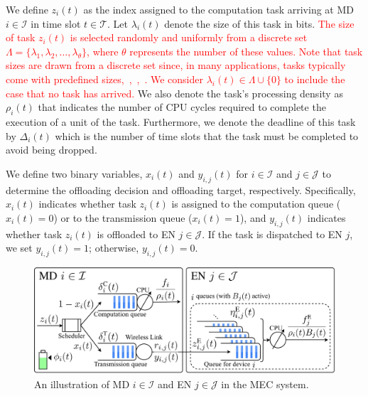 \documentclass[10pt, journal,letterpaper]{IEEEtran}
\begin{document}
We define $z_i(t)$ as the index assigned to the computation task arriving at MD $i \in \mathcal{I}$ in time slot $t \in \mathcal{T}$. Let $\lambda_i(t)$ denote the size of this task in bits. \textcolor{red}{The size of task \( z_i(t) \) is selected randomly and uniformly from a discrete set \( \Lambda = \{\lambda_1, \lambda_2, \ldots, \lambda_{\theta}\} \), where \( \theta \) represents the number of these values. Note that task sizes are drawn from a discrete set since, in many applications, tasks typically come with predefined sizes,~\cite{wang2020intelligent},~\cite{zhang2019toward},~\cite{allahham2022multi}. We consider $\lambda_i(t) \in \Lambda \cup \{0\}$ to include the case that no task has arrived.} We also denote the task's processing density as $\rho_i(t)$ that indicates the number of CPU cycles required to complete the execution of a unit of the task. Furthermore, we denote the deadline of this task by $\Delta_i(t)$ which is the number of time slots that the task must be completed to avoid being dropped.

We define two binary variables, $x_i(t)$ and $y_{i,j}(t)$ for $i \in \mathcal{I}$ and $j \in \mathcal{J}$ to determine the offloading decision and offloading target, respectively. Specifically, $x_i(t)$ indicates whether task $z_i(t)$ is assigned to the computation queue ($x_i(t) = 0$) or to the transmission queue ($x_i(t) = 1$), and $y_{i,j}(t)$ indicates whether task $z_i(t)$ is offloaded to EN $j \in \mathcal{J}$. If the task is dispatched to EN $j$, we set $y_{i,j}(t) = 1$; otherwise, $y_{i,j}(t) = 0$.


 \begin{figure}
 	\captionsetup{name=Fig.}
 	\centering
 	\includegraphics[width=1\linewidth]{ queue}
 	\vspace*{-5mm}
 	\caption{An illustration of MD $i \in \mathcal{I}$ and EN $j \in \mathcal{J}$ in the MEC system.}
 	\label{fig1}
 \end{figure}
\end{document}
